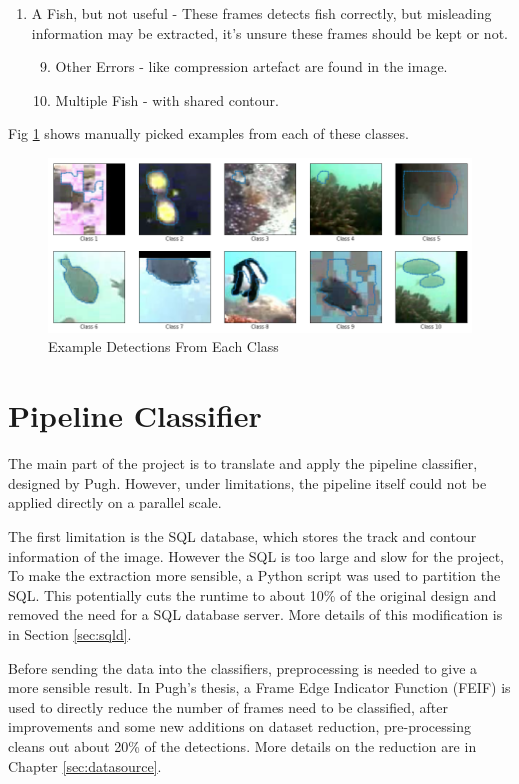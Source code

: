 \documentclass[bsc,logo,twoside,fullspacing,parskip]{infthesis}
\begin{document}
\begin{enumerate}
 \item A Fish, but not useful - These frames detects fish correctly, but misleading information may be extracted, it's unsure these frames should be kept or not.
 \begin{enumerate}
   \setcounter{enumii}{8} 
   \item Other Errors - like compression artefact are found in the image.
   \item Multiple Fish - with shared contour.
 \end{enumerate}
\end{enumerate}

Fig \ref{fig:classes} shows manually picked examples from each of these classes.

\begin{figure}
    \centering
    \includegraphics[scale=0.44]{graph/class_sample.png}
    \caption{Example Detections From Each Class}
    \label{fig:classes}
\end{figure}

\section{Pipeline Classifier}

The main part of the project is to translate and apply the pipeline classifier, designed by Pugh\cite{P1}. 
However, under limitations, the pipeline itself could not be applied directly on a parallel scale.

The first limitation is the SQL database, which stores the track and contour information of the image. 
However the SQL is too large and slow for the project, To make the extraction more sensible, a Python script was used to partition the SQL.
This potentially cuts the runtime to about 10\% of the original design and removed the need for a SQL database server. 
More details of this modification is in Section \ref{sec:sqld}.

Before sending the data into the classifiers, preprocessing is needed to give a more sensible result.
In Pugh's thesis\cite{P1}, a Frame Edge Indicator Function (FEIF) is used to directly reduce the number of frames need to be classified, after improvements and some new additions on dataset reduction, pre-processing cleans out about 20\% of the detections. More details on the reduction are in Chapter \ref{sec:datasource}.
\end{document}
